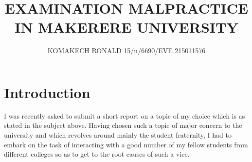 \documentclass {article}
\begin{document}
\title{EXAMINATION MALPRACTICE IN
MAKERERE UNIVERSITY
}
\author{KOMAKECH RONALD 15/u/6690/EVE 215011576}

\maketitle

\section{Introduction}
I was recently asked  to submit a short report on a topic of my choice which is as stated in the subject above. Having chosen such a topic of major concern to the university and which revolves around mainly the student fraternity, I had to embark on the task of interacting with a good number of my fellow students from different colleges so as to get to the root causes of such a vice.
\end{document}
